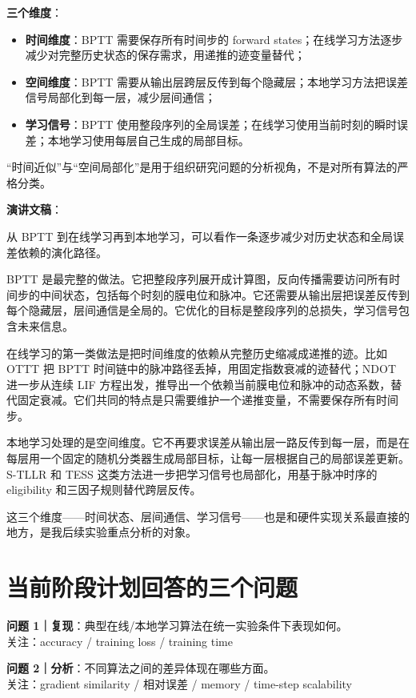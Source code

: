 \documentclass[journal,12pt,onecolumn]{IEEEtran}
\begin{document}
\textbf{三个维度}：
\begin{itemize}
    \item \textbf{时间维度}：BPTT 需要保存所有时间步的 forward states；在线学习方法逐步减少对完整历史状态的保存需求，用递推的迹变量替代；
    \item \textbf{空间维度}：BPTT 需要从输出层跨层反传到每个隐藏层；本地学习方法把误差信号局部化到每一层，减少层间通信；
    \item \textbf{学习信号}：BPTT 使用整段序列的全局误差；在线学习使用当前时刻的瞬时误差；本地学习使用每层自己生成的局部目标。
\end{itemize}

“时间近似”与“空间局部化”是用于组织研究问题的分析视角，不是对所有算法的严格分类。

\textbf{演讲文稿}：

从 BPTT 到在线学习再到本地学习，可以看作一条逐步减少对历史状态和全局误差依赖的演化路径。

BPTT 是最完整的做法。它把整段序列展开成计算图，反向传播需要访问所有时间步的中间状态，包括每个时刻的膜电位和脉冲。它还需要从输出层把误差反传到每个隐藏层，层间通信是全局的。它优化的目标是整段序列的总损失，学习信号包含未来信息。

在线学习的第一类做法是把时间维度的依赖从完整历史缩减成递推的迹。比如 OTTT 把 BPTT 时间链中的脉冲路径丢掉，用固定指数衰减的迹替代；NDOT 进一步从连续 LIF 方程出发，推导出一个依赖当前膜电位和脉冲的动态系数，替代固定衰减。它们共同的特点是只需要维护一个递推变量，不需要保存所有时间步。

本地学习处理的是空间维度。它不再要求误差从输出层一路反传到每一层，而是在每层用一个固定的随机分类器生成局部目标，让每一层根据自己的局部误差更新。S-TLLR 和 TESS 这类方法进一步把学习信号也局部化，用基于脉冲时序的 eligibility 和三因子规则替代跨层反传。

这三个维度——时间状态、层间通信、学习信号——也是和硬件实现关系最直接的地方，是我后续实验重点分析的对象。

\section{当前阶段计划回答的三个问题}

\textbf{问题 1｜复现}：典型在线/本地学习算法在统一实验条件下表现如何。\\
关注：accuracy / training loss / training time

\textbf{问题 2｜分析}：不同算法之间的差异体现在哪些方面。\\
关注：gradient similarity / 相对误差 / memory / time-step scalability
\end{document}
